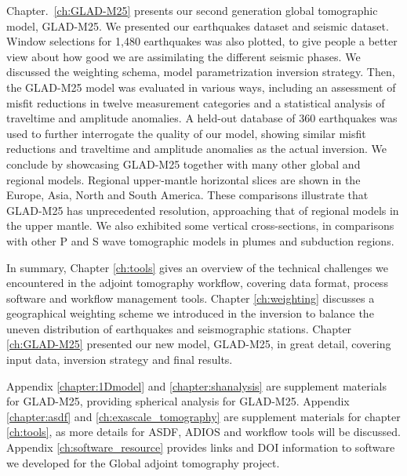 Chapter.~\ref{ch:GLAD-M25} presents our second generation global tomographic model, GLAD-M25.
We presented our earthquakes dataset and seismic dataset.
Window selections for 1,480 earthquakes was also plotted, to give people a better
view about how good we are assimilating the different seismic phases.
We discussed the weighting schema, model parametrization inversion strategy.
Then, the GLAD-M25 model was evaluated in various ways,
including an assessment of misfit reductions
in twelve measurement categories and
a statistical analysis of traveltime and amplitude anomalies.
A held-out database of 360 earthquakes was used to further interrogate the quality of our model,
showing similar misfit reductions and traveltime and amplitude anomalies as the actual inversion.
We conclude by showcasing GLAD-M25 together with many other global and regional models.
Regional upper-mantle horizontal slices are shown in the Europe, Asia, North and South America.
These comparisons illustrate that GLAD-M25 has unprecedented resolution, approaching that of regional models
in the upper mantle. We also exhibited some vertical cross-sections, in comparisons with other
P and S wave tomographic models in plumes and subduction regions.

In summary, Chapter \ref{ch:tools} gives an overview of the technical challenges we encountered
in the adjoint tomography workflow, covering data format, process software and workflow
management tools.
Chapter \ref{ch:weighting} discusses a geographical weighting scheme we introduced
in the inversion to balance the uneven distribution of earthquakes and seismographic stations.
Chapter \ref{ch:GLAD-M25} presented our new model, GLAD-M25, in great detail, covering input data,
inversion strategy and final results.

Appendix \ref{chapter:1Dmodel} and \ref{chapter:shanalysis} are supplement materials for GLAD-M25,
providing spherical analysis for GLAD-M25. Appendix \ref{chapter:asdf} and
\ref{ch:exascale_tomography} are supplement materials for chapter \ref{ch:tools}, as more details
for ASDF, ADIOS and workflow tools will be discussed. Appendix \ref{ch:software_resource}
provides links and DOI information to software we developed for the Global adjoint tomography project.
